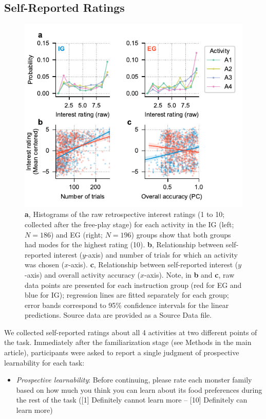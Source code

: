 \begin{subappendices}
\section{Self-Reported Ratings}\label{CH4A_S_self_reported_ratings}

\begin{figure}[tbh]
    \centering
    \includegraphics[width=.75\columnwidth]{Figures/c4/fig_s2.pdf}
    \caption[]{\textbf{a}, Histograms of the raw retrospective interest ratings (1 to 10; collected after the free-play stage) for each activity in the \ac{IG} (left; $N=186$) and \ac{EG} (right; $N=196$) groups show that both groups had modes for the highest rating (10). \textbf{b}, Relationship between self-reported interest ($y$-axis) and number of trials for which an activity was chosen ($x$-axis). \textbf{c}, Relationship between self-reported interest ($y$-axis) and overall activity accuracy ($x$-axis). Note, in \textbf{b} and \textbf{c}, raw data points are presented for each instruction group (red for \ac{EG} and blue for \ac{IG}); regression lines are fitted separately for each group; error bands correspond to 95\% confidence intervals for the linear predictions. Source data are provided as a Source Data file.}
    \label{fig:CH4A_2_self_reported_ratings}
\end{figure}

We collected self-reported ratings about all 4 activities at two different points of the task. Immediately after the familiarization stage (see Methods in the main article), participants were asked to report a single judgment of prospective learnability for each task: 

\begin{itemize}
\item \textit{Prospective learnability}: Before continuing, please rate each monster family based on how much you think you can learn about its food preferences during the rest of the task ([1] Definitely cannot learn more -- [10] Definitely can learn more)
\end{itemize}


\end{subappendices}

